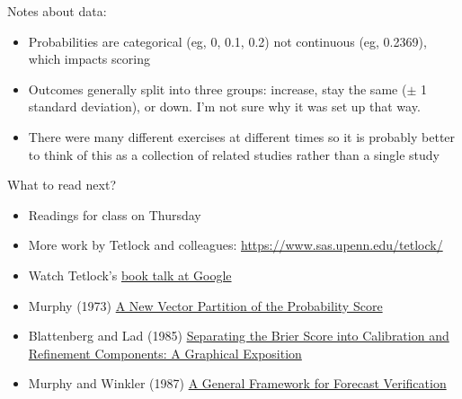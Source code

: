 \documentclass[aspectratio=169]{beamer}
\begin{document}
\begin{frame}

Notes about data:
\begin{itemize}
\item Probabilities are categorical (eg, 0, 0.1, 0.2) not continuous (eg, 0.2369), which impacts scoring
\pause
\item Outcomes generally split into three groups: increase, stay the same ($\pm$ 1 standard deviation), or down.  I'm not sure why it was set up that way.
\pause
\item There were many different exercises at different times so it is probably better to think of this as a collection of related studies rather than a single study
\end{itemize}

\end{frame}
\begin{frame}

What to read next?
\begin{itemize}
\item Readings for class on Thursday
\item More work by Tetlock and colleagues: \url{https://www.sas.upenn.edu/tetlock/}
\item Watch Tetlock's \href{https://www.youtube.com/watch?v=f73A-HB-08M}{book talk at Google}
\item Murphy (1973) \href{https://doi.org/10.1175/1520-0450(1973)012<0595:ANVPOTs>2.0.CO;2}{A New Vector Partition of the Probability Score}
\item Blattenberg and Lad (1985) \href{https://dx.doi.org/10.1080/00031305.1985.10479382}{Separating the Brier Score into Calibration and Refinement Components: A Graphical Exposition}
\item Murphy and Winkler (1987) \href{https://doi.org/10.1175/1520-0493(1987)115\%3C1330:AGFFFV\%3E2.0.CO;2}{A General Framework for Forecast Verification}
\end{itemize}

\end{frame}
\end{document}
